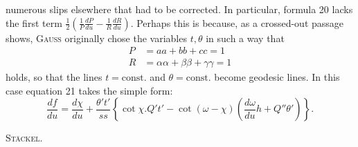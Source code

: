 %
numerous slips elsewhere that had to be corrected. In particular, formula 20 lacks the first term $\tfrac12\left(\frac1P\frac{dP}{du}-\frac1R\frac{dR}{du}\right)$. Perhaps this is because, as a crossed-out passage shows, \textsc{Gauss} originally chose the variables $t,\theta$ in such a way that
\[
\begin{aligned}
P&=aa+bb+cc=1\\
R&=\alpha\alpha+\beta\beta+\gamma\gamma=1
\end{aligned}
\]
holds, so that the lines $t=\text{const.}$ and $\theta=\text{const.}$ become geodesic lines. In this case equation 21 takes the simple form:
\[
\frac{df}{du}=\frac{d\chi}{du}+\frac{\theta't'}{ss}\left\{\cot\chi.Q't'-\cot(\omega-\chi)\left(\frac{d\omega}{du}h+Q''\theta'\right)\right\}.
\]
\begin{flushright}\textsc{Stäckel.}\end{flushright}
